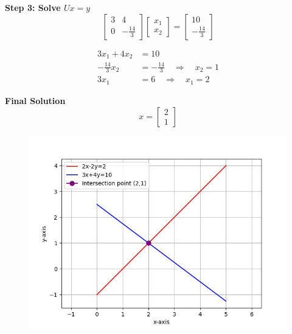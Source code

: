 \documentclass[journal]{IEEEtran}
\begin{document}
\textbf{Step 3: Solve \(Ux = y\)}
\[
\begin{bmatrix} 3 & 4 \\ 0 & -\frac{14}{3} \end{bmatrix} \begin{bmatrix} x_1 \\ x_2 \end{bmatrix} = \begin{bmatrix} 10 \\ -\frac{14}{3} \end{bmatrix} \tag{16}
\]

\begin{align}
    3x_1 + 4x_2 &= 10 \tag{17} \\
    -\frac{14}{3}x_2 &= -\frac{14}{3} \quad \Rightarrow \quad x_2 = 1 \tag{18} \\
    3x_1 &= 6 \quad \Rightarrow \quad x_1 = 2 \tag{19}
\end{align}

\textbf{Final Solution}
\[
x = \begin{bmatrix} 2 \\ 1 \end{bmatrix} \tag{20}
\]

\begin{figure}[h!]
   \centering
   \includegraphics[width=\columnwidth]{fig/combined_fig.jpg}
\end{figure}
\end{document}
